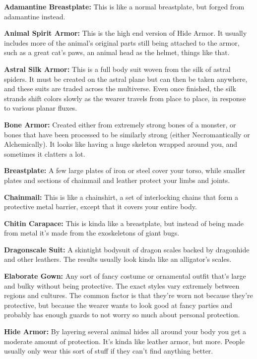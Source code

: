 \textbf{Adamantine Breastplate:} This is like a normal breastplate, but forged from adamantine instead.

\textbf{Animal Spirit Armor:} This is the high end version of Hide Armor. It usually includes more of the animal's original parts still being attached to the armor, such as a great cat's paws, an animal head as the helmet, things like that.

\textbf{Astral Silk Armor:} This is a full body suit woven from the silk of astral spiders. It must be created on the astral plane but can then be taken anywhere, and these suits are traded across the multiverse. Even once finished, the silk strands shift colors slowly as the wearer travels from place to place, in response to various planar fluxes.

\textbf{Bone Armor:} Created either from extremely strong bones of a monster, or bones that have been processed to be similarly strong (either Necromantically or Alchemically). It looks like having a huge skeleton wrapped around you, and sometimes it clatters a lot.

\textbf{Breastplate:} A few large plates of iron or steel cover your torso, while smaller plates and sections of chainmail and leather protect your limbs and joints.

\textbf{Chainmail:} This is like a chainshirt, a set of interlocking chains that form a protective metal barrier, except that it covers your entire body.

\textbf{Chitin Carapace:} This is kinda like a breastplate, but instead of being made from metal it's made from the exoskeletons of giant bugs.

\textbf{Dragonscale Suit:} A skintight bodysuit of dragon scales backed by dragonhide and other leathers. The results usually look kinda like an alligator's scales.

\textbf{Elaborate Gown:} Any sort of fancy costume or ornamental outfit that's large and bulky without being protective. The exact styles vary extremely between regions and cultures. The common factor is that they're worn not because they're protective, but because the wearer wants to look good at fancy parties and probably has enough guards to not worry so much about personal protection.

\textbf{Hide Armor:} By layering several animal hides all around your body you get a moderate amount of protection. It's kinda like leather armor, but more. People usually only wear this sort of stuff if they can't find anything better.

